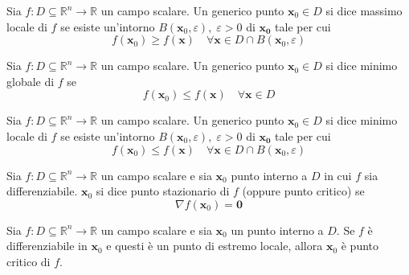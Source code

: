             \begin{definition}
                Sia $f: D \subseteq \mathbb{R}^{n} \rightarrow \mathbb{R}$ un campo scalare. Un generico punto $\mathbf{x}_0 \in D$ si dice massimo locale di $f$ se esiste un'intorno $B(\mathbf{x}_0, \varepsilon), \; \varepsilon > 0$ di
                $\mathbf{x_0}$ tale per cui
                \[
                    f(\mathbf{x}_0) \geq f(\mathbf{x}) \quad \forall \mathbf{x} \in D \cap B(\mathbf{x}_0, \varepsilon)
                \]
            \end{definition}

            \begin{definition}
                Sia $f: D \subseteq \mathbb{R}^{n} \rightarrow \mathbb{R}$ un campo scalare. Un generico punto $\mathbf{x}_0 \in D$ si dice minimo globale di $f$ se
                \[
                    f(\mathbf{x}_0) \leq f(\mathbf{x}) \quad \forall \mathbf{x} \in D
                \]
            \end{definition}

            \begin{definition}
                Sia $f: D \subseteq \mathbb{R}^{n} \rightarrow \mathbb{R}$ un campo scalare. Un generico punto $\mathbf{x}_0 \in D$ si dice minimo locale di $f$ se esiste un'intorno $B(\mathbf{x}_0, \varepsilon), \; \varepsilon > 0$ di
                $\mathbf{x_0}$ tale per cui
                \[
                    f(\mathbf{x}_0) \leq f(\mathbf{x}) \quad \forall \mathbf{x} \in D \cap B(\mathbf{x}_0, \varepsilon)
                \]
            \end{definition}

            \begin{definition}
                Sia $f: D \subseteq \mathbb{R}^{n} \rightarrow \mathbb{R}$ un campo scalare e sia $\mathbf{x}_0$ punto interno a $D$ in cui $f$ sia differenziabile. $\mathbf{x}_0$ si dice punto stazionario di $f$ (oppure punto critico) se
                \[
                    \nabla f(\mathbf{x}_0) = \mathbf{0}
                \]
            \end{definition}

            \begin{theorem}
                Sia $f: D \subseteq \mathbb{R}^{n} \rightarrow \mathbb{R}$ un campo scalare e sia $\mathbf{x}_0$ un punto interno a $D$.
                Se $f$ è differenziabile in $\mathbf{x}_0$ e questi è un punto di estremo locale, allora $\mathbf{x}_0$ è punto critico di $f$.
            \end{theorem}

